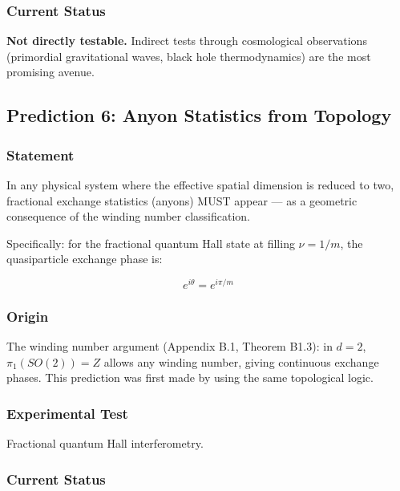 \documentclass[aps,prd,preprint,superscriptaddress,longbibliography,floatfix]{revtex4-2}
\theoremstyle{remark}
\begin{document}
\subsubsection{Current Status}

\textbf{Not directly testable.} Indirect tests through cosmological observations (primordial gravitational waves, black hole thermodynamics) are the most promising avenue.



\subsection{Prediction 6: Anyon Statistics from Topology}


\subsubsection{Statement}

In any physical system where the effective spatial dimension is reduced to two, fractional exchange statistics (anyons) MUST appear --- as a geometric consequence of the winding number classification.

Specifically: for the fractional quantum Hall state at filling $\nu = 1/m$, the quasiparticle exchange phase is:


\begin{equation}
    e^{i\theta} = e^{i\pi/m}
\end{equation}

\subsubsection{Origin}

The winding number argument (Appendix B.1, Theorem B1.3): in $d = 2$, $\pi_{1}(SO(2)) = Z$ allows any winding number, giving continuous exchange phases. This prediction was first made by \cite{LeinaasMyrhei1977} using the same topological logic.


\subsubsection{Experimental Test}

Fractional quantum Hall interferometry.


\subsubsection{Current Status}
\end{document}
